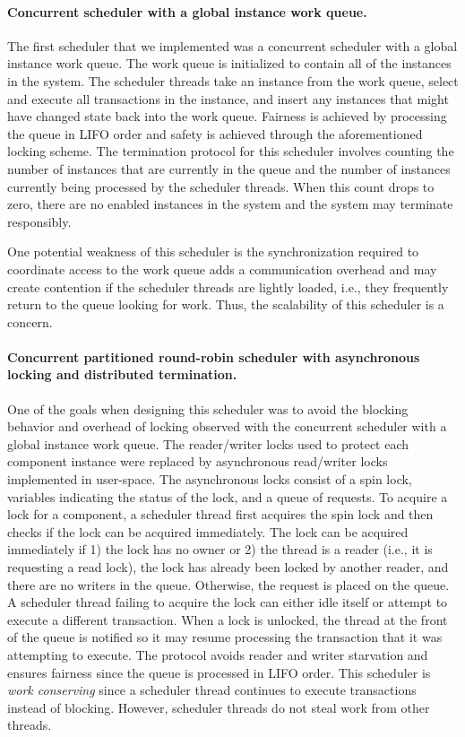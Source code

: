 \paragraph{Concurrent scheduler with a global instance work queue.}
The first scheduler that we implemented was a concurrent scheduler with a global instance work queue.
The work queue is initialized to contain all of the instances in the system.
The scheduler threads take an instance from the work queue, select and execute all transactions in the instance, and insert any instances that might have changed state back into the work queue.
Fairness is achieved by processing the queue in LIFO order and safety is achieved through the aforementioned locking scheme.
The termination protocol for this scheduler involves counting the number of instances that are currently in the queue and the number of instances currently being processed by the scheduler threads.
When this count drops to zero, there are no enabled instances in the system and the system may terminate responsibly.

One potential weakness of this scheduler is the synchronization required to coordinate access to the work queue adds a communication overhead and may create contention if the scheduler threads are lightly loaded, i.e., they frequently return to the queue looking for work.
Thus, the scalability of this scheduler is a concern.

\paragraph{Concurrent partitioned round-robin scheduler with asynchronous locking and distributed termination.}
One of the goals when designing this scheduler was to avoid the blocking behavior and overhead of locking observed with the concurrent scheduler with a global instance work queue.
The reader/writer locks used to protect each component instance were replaced by asynchronous read/writer locks implemented in user-space.
The asynchronous locks consist of a spin lock, variables indicating the status of the lock, and a queue of requests.
To acquire a lock for a component, a scheduler thread first acquires the spin lock and then checks if the lock can be acquired immediately.
The lock can be acquired immediately if 1) the lock has no owner or 2) the thread is a reader (i.e., it is requesting a read lock), the lock has already been locked by another reader, and there are no writers in the queue.
Otherwise, the request is placed on the queue.
A scheduler thread failing to acquire the lock can either idle itself or attempt to execute a different transaction.
When a lock is unlocked, the thread at the front of the queue is notified so it may resume processing the transaction that it was attempting to execute.
The protocol avoids reader and writer starvation and ensures fairness since the queue is processed in LIFO order.
This scheduler is \emph{work conserving} since a scheduler thread continues to execute transactions instead of blocking.
However, scheduler threads do not steal work from other threads.

